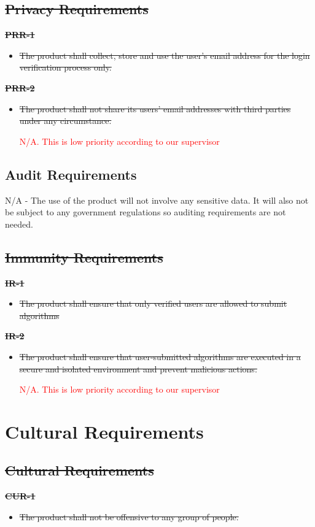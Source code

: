 \documentclass[12pt]{article}
\begin{document}
\subsection{\sout{Privacy Requirements}}
\textbf{\sout{PRR-1}}
\begin{itemize}
    \item \sout{The product shall collect, store and use the user’s email address for the login verification process only.}
\end{itemize}
\textbf{\sout{PRR-2}}
\begin{itemize}
    \item \sout{The product shall not share its users’ email addresses with third parties under any circumstance. }

    \textcolor{red}{N/A. This is low priority according to our supervisor}
\end{itemize}
\subsection{Audit Requirements}
N/A - The use of the product will not involve any sensitive data. It will also not be subject to any government regulations so auditing requirements are not needed.

\subsection{\sout{Immunity Requirements}}
\textbf{\sout{IR-1}}
\begin{itemize}
    \item \sout{The product shall ensure that only verified users are allowed to submit algorithms}
\end{itemize}
\textbf{\sout{IR-2}}
\begin{itemize}
    \item \sout{The product shall ensure that user-submitted algorithms are executed in a secure and isolated environment and prevent malicious actions.}

    \textcolor{red}{N/A. This is low priority according to our supervisor}
\end{itemize}

\section{Cultural Requirements}
\subsection{\sout{Cultural Requirements}}
\textbf{\sout{CUR-1}}
\begin{itemize}
    \item \sout{The product shall not be offensive to any group of people.}
\end{itemize}
\end{document}
